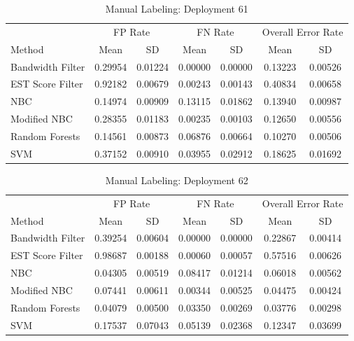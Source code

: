 \documentclass[twoside]{article}
\begin{document}
\begin{table}[H]
\caption{Manual Labeling: Deployment 61}
\centering
\begin{tabular}{lcccccc}
\toprule
\multicolumn{1}{c}{ } 
&\multicolumn{2}{c}{FP Rate } 
&\multicolumn{2}{c}{FN Rate } 
&\multicolumn{2}{c}{Overall Error Rate } \\
\cmidrule(r){2-3}
\cmidrule(r){4-5}
\cmidrule(r){6-7}
Method& Mean & SD & Mean & SD & Mean & SD \\
\midrule
Bandwidth Filter & 0.29954 & 0.01224 & 0.00000 & 0.00000 & 0.13223 & 0.00526 \\
EST Score Filter & 0.92182 & 0.00679 & 0.00243 & 0.00143 & 0.40834 & 0.00658 \\
NBC & 0.14974 & 0.00909 & 0.13115 & 0.01862 & 0.13940 & 0.00987 \\
Modified NBC & 0.28355 & 0.01183 & 0.00235 & 0.00103 & 0.12650 & 0.00556 \\
Random Forests & 0.14561 & 0.00873 & 0.06876 & 0.00664 & 0.10270 & 0.00506 \\
SVM & 0.37152 & 0.00910 & 0.03955 & 0.02912 & 0.18625 & 0.01692 \\
\bottomrule
\end{tabular}
\end{table}

\begin{table}[H]
\caption{Manual Labeling: Deployment 62}
\centering
\begin{tabular}{lcccccc}
\toprule
\multicolumn{1}{c}{ } 
&\multicolumn{2}{c}{FP Rate } 
&\multicolumn{2}{c}{FN Rate } 
&\multicolumn{2}{c}{Overall Error Rate } \\
\cmidrule(r){2-3}
\cmidrule(r){4-5}
\cmidrule(r){6-7}
Method& Mean & SD & Mean & SD & Mean & SD \\
\midrule
Bandwidth Filter & 0.39254 & 0.00604 & 0.00000 & 0.00000 & 0.22867 & 0.00414 \\
EST Score Filter & 0.98687 & 0.00188 & 0.00060 & 0.00057 & 0.57516 & 0.00626 \\
NBC & 0.04305 & 0.00519 & 0.08417 & 0.01214 & 0.06018 & 0.00562 \\
Modified NBC & 0.07441 & 0.00611 & 0.00344 & 0.00525 & 0.04475 & 0.00424 \\
Random Forests & 0.04079 & 0.00500 & 0.03350 & 0.00269 & 0.03776 & 0.00298 \\
SVM & 0.17537 & 0.07043 & 0.05139 & 0.02368 & 0.12347 & 0.03699 \\
\bottomrule
\end{tabular}
\end{table}
\end{document}
